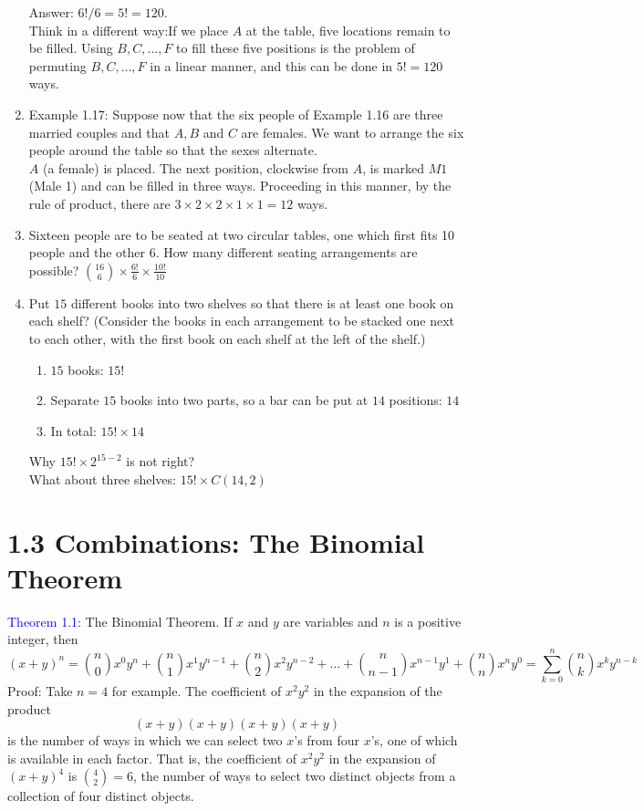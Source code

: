 \documentclass[letter]{book}
\begin{document}
\begin{enumerate}
    Answer: $6!/6=5!=120$.\\
    Think in a different way:If we place $A$ at the table, five locations remain to be filled. Using $B,C,\ldots, F$ to fill these five positions is the problem of permuting $B,C,\ldots, F$ in a linear manner, and this can be done in $5!=120$ ways.
    \item Example 1.17: Suppose now that the six people of Example 1.16 are three married couples and that $A,B$ and $C$ are females. We want to arrange the six people around the table so that the sexes alternate.\\
    $A$ (a female) is placed. The next position, clockwise from $A$, is marked $M1$ (Male 1) and can be filled in three ways. Proceeding in this manner, by the rule of product, there are $3\times 2\times 2\times 1\times 1=12$ ways.
    \item Sixteen people are to be seated at two circular tables, one which first fits 10 people and the other 6. How many different seating arrangements are possible? $\binom{16}{6}\times \frac{6!}{6}\times \frac{10!}{10}$
    \item Put $15$ different books into two shelves so that there is at least one book on each shelf? (Consider the books in each arrangement to be stacked one next to each other, with the first book on each shelf at the left of the shelf.)
    \begin{enumerate}
        \item $15$ books: $15!$
        \item Separate $15$ books into two parts, so a bar can be put at $14$ positions: $14$
        \item In total: $15!\times 14$
    \end{enumerate}
    Why $15!\times 2^{15-2}$ is not right?\\
    What about three shelves: $15!\times C(14,2)$
    
\end{enumerate}

\section*{1.3 Combinations: The Binomial Theorem}
\textcolor{blue}{Theorem 1.1}: The Binomial Theorem. If $x$ and $y$ are variables and $n$ is a positive integer, then
$$
(x+y)^n=\binom{n}{0}x^0y^n+\binom{n}{1}x^1y^{n-1}+\binom{n}{2}x^2y^{n-2}+\dots+\binom{n}{n-1}x^{n-1}y^1+\binom{n}{n}x^{n}y^0=\sum_{k=0}^n\binom{n}{k}x^ky^{n-k}
$$
Proof: Take $n=4$ for example. The coefficient of $x^2y^2$ in the expansion of the product 
$$
(x+y)(x+y)(x+y)(x+y)
$$
is the number of ways in which we can select two $x$'s from four $x$'s, one of which is available in each factor. That is, the coefficient of $x^2y^2$ in the expansion of $(x+y)^4$ is $\binom{4}{2}=6$, the number of ways to select two distinct objects from a collection of four distinct objects.
\end{document}
